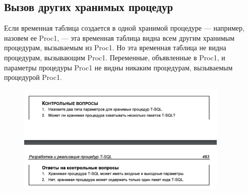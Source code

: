 \subsection{Вызов других хранимых процедур}
Если временная таблица создается в одной хранимой процедуре — например,
назовем ее Proc1, — эта временная таблица видна всем другим хранимым процедурам, вызываемым из Proc1. Но эта временная таблица не видна процедурам,
вызывающим Proc1. Переменные, объявленные в Proc1, и параметры процедуры Proc1 не видны никаким процедурам, вызываемым процедурой Proc1. 

\begin{figure}[h!]
	\begin{center}
		\includegraphics[width=0.9\textwidth]{img/control38.png}
	\end{center}
	\captionsetup{justification=centering}
\end{figure}




